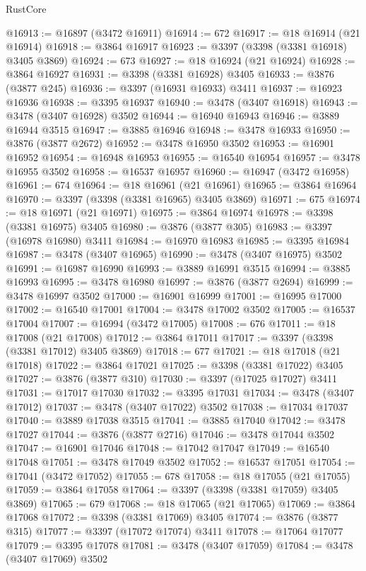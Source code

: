 \begin{lexlean}{RustCore}
\begin{coremodule}
@16913 := @16897 (@3472 @16911)
@16914 := 672
@16917 := @18 @16914 (@21 @16914)
@16918 := @3864 @16917
@16923 := @3397 (@3398 (@3381 @16918) @3405 @3869)
@16924 := 673
@16927 := @18 @16924 (@21 @16924)
@16928 := @3864 @16927
@16931 := @3398 (@3381 @16928) @3405
@16933 := @3876 (@3877 @245)
@16936 := @3397 (@16931 @16933) @3411
@16937 := @16923 @16936
@16938 := @3395 @16937
@16940 := @3478 (@3407 @16918)
@16943 := @3478 (@3407 @16928) @3502
@16944 := @16940 @16943
@16946 := @3889 @16944 @3515
@16947 := @3885 @16946
@16948 := @3478 @16933
@16950 := @3876 (@3877 @2672)
@16952 := @3478 @16950 @3502
@16953 := @16901 @16952
@16954 := @16948 @16953
@16955 := @16540 @16954
@16957 := @3478 @16955 @3502
@16958 := @16537 @16957
@16960 := @16947 (@3472 @16958)
@16961 := 674
@16964 := @18 @16961 (@21 @16961)
@16965 := @3864 @16964
@16970 := @3397 (@3398 (@3381 @16965) @3405 @3869)
@16971 := 675
@16974 := @18 @16971 (@21 @16971)
@16975 := @3864 @16974
@16978 := @3398 (@3381 @16975) @3405
@16980 := @3876 (@3877 @305)
@16983 := @3397 (@16978 @16980) @3411
@16984 := @16970 @16983
@16985 := @3395 @16984
@16987 := @3478 (@3407 @16965)
@16990 := @3478 (@3407 @16975) @3502
@16991 := @16987 @16990
@16993 := @3889 @16991 @3515
@16994 := @3885 @16993
@16995 := @3478 @16980
@16997 := @3876 (@3877 @2694)
@16999 := @3478 @16997 @3502
@17000 := @16901 @16999
@17001 := @16995 @17000
@17002 := @16540 @17001
@17004 := @3478 @17002 @3502
@17005 := @16537 @17004
@17007 := @16994 (@3472 @17005)
@17008 := 676
@17011 := @18 @17008 (@21 @17008)
@17012 := @3864 @17011
@17017 := @3397 (@3398 (@3381 @17012) @3405 @3869)
@17018 := 677
@17021 := @18 @17018 (@21 @17018)
@17022 := @3864 @17021
@17025 := @3398 (@3381 @17022) @3405
@17027 := @3876 (@3877 @310)
@17030 := @3397 (@17025 @17027) @3411
@17031 := @17017 @17030
@17032 := @3395 @17031
@17034 := @3478 (@3407 @17012)
@17037 := @3478 (@3407 @17022) @3502
@17038 := @17034 @17037
@17040 := @3889 @17038 @3515
@17041 := @3885 @17040
@17042 := @3478 @17027
@17044 := @3876 (@3877 @2716)
@17046 := @3478 @17044 @3502
@17047 := @16901 @17046
@17048 := @17042 @17047
@17049 := @16540 @17048
@17051 := @3478 @17049 @3502
@17052 := @16537 @17051
@17054 := @17041 (@3472 @17052)
@17055 := 678
@17058 := @18 @17055 (@21 @17055)
@17059 := @3864 @17058
@17064 := @3397 (@3398 (@3381 @17059) @3405 @3869)
@17065 := 679
@17068 := @18 @17065 (@21 @17065)
@17069 := @3864 @17068
@17072 := @3398 (@3381 @17069) @3405
@17074 := @3876 (@3877 @315)
@17077 := @3397 (@17072 @17074) @3411
@17078 := @17064 @17077
@17079 := @3395 @17078
@17081 := @3478 (@3407 @17059)
@17084 := @3478 (@3407 @17069) @3502

\end{coremodule}
\end{lexlean}
